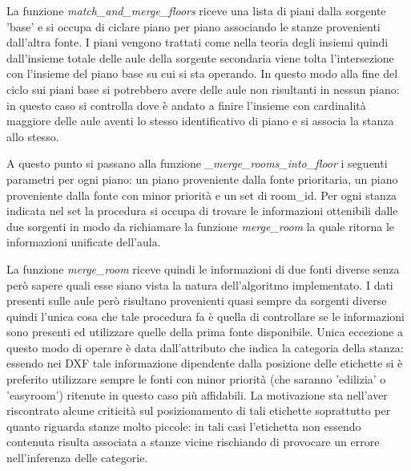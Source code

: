 \documentclass[12pt]{report}
\begin{document}
La funzione \textit{match\_and\_merge\_floors} riceve una lista di piani dalla sorgente 'base' e si occupa di ciclare piano per piano associando le stanze provenienti dall'altra fonte. I piani vengono trattati come nella teoria degli insiemi quindi dall'insieme totale delle aule della sorgente secondaria viene tolta l'intersezione con l'insieme del piano base su cui si sta operando. In questo modo alla fine del ciclo sui piani base si potrebbero avere delle aule non risultanti in nessun piano: in questo caso si controlla dove è andato a finire l'insieme con cardinalità maggiore delle aule aventi lo stesso identificativo di piano e si associa la stanza allo stesso.

A questo punto si passano alla funzione \textit{\_merge\_rooms\_into\_floor} i seguenti parametri per ogni piano: un piano proveniente dalla fonte prioritaria, un piano proveniente dalla fonte con minor priorità e un set di room\_id.
Per ogni stanza indicata nel set la procedura si occupa di trovare le informazioni ottenibili dalle due sorgenti in modo da richiamare la funzione \textit{merge\_room} la quale ritorna le informazioni unificate dell'aula.

La funzione \textit{merge\_room} riceve quindi le informazioni di due fonti diverse senza però sapere quali esse siano vista la natura dell'algoritmo implementato.
I dati presenti sulle aule però risultano provenienti quasi sempre da sorgenti diverse quindi l'unica cosa che tale procedura fa è quella di controllare se le informazioni sono presenti ed utilizzare quelle della prima fonte disponibile.
Unica eccezione a questo modo di operare è data dall'attributo che indica la categoria della stanza: essendo nei DXF tale informazione dipendente dalla posizione delle etichette si è preferito utilizzare sempre le fonti con minor priorità (che saranno 'edilizia' o 'easyroom') ritenute in questo caso più affidabili.
La motivazione sta nell'aver riscontrato alcune criticità sul posizionamento di tali etichette soprattutto per quanto riguarda stanze molto piccole: in tali casi l'etichetta non essendo contenuta risulta associata a stanze vicine rischiando di provocare un errore nell'inferenza delle categorie.

\vspace{5mm} %
\end{document}
